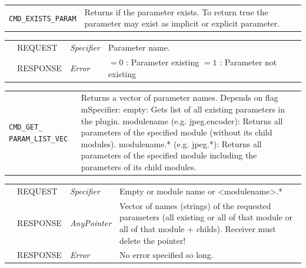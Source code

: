 \vspace{1 cm}

\noindent
\begin{tabularx}{\textwidth}{|p{3.6cm}|X|}
	\cline{1-1}\cline{2-2}
	  \lstinline|CMD_EXISTS_PARAM| & Returns if the parameter exists. To return true the parameter may exist as implicit or explicit parameter. \\
\end{tabularx}
\begin{tabularx}{\textwidth}{|p{3.6cm}|p{2.3cm}|p{2cm}|X|}
	\cline{1-1}\cline{2-2}\cline{3-3}\cline{4-4}
	   &  REQUEST     &  {\em Specifier}   &  Parameter name.   \\
	\cline{1-1}\cline{2-2}\cline{3-3}\cline{4-4}                        &  RESPONSE    &  {\em Error}  &  $=0$ : Parameter existing \newline $=1$ : Parameter not existing   \\
	\hline
\end{tabularx}

\vspace{1 cm}

\noindent
\begin{tabularx}{\textwidth}{|p{3.6cm}|X|}
	\cline{1-1}\cline{2-2}
	  \lstinline|CMD_GET_ PARAM_LIST_VEC| & Returns a vector of parameter names.  \newline Depends on flag mSpecifier:  \newline  empty: Gets list of all existing parameters in the plugin.  \newline  modulename (e.g. jpeg.encoder): Returns all parameters of the specified module (without its child modules).  \newline  modulename.* (e.g. jpeg.*): Returns all parameters of the specified module including the parameters of its child modules.\\
\end{tabularx}
\begin{tabularx}{\textwidth}{|p{3.6cm}|p{2.3cm}|p{2cm}|X|}
	\cline{1-1}\cline{2-2}\cline{3-3}\cline{4-4}
	   &  REQUEST     &  {\em Specifier}   &  Empty or module name or \newline\mbox{\textless modulename\textgreater.*}   \\
	\cline{1-1}\cline{2-2}\cline{3-3}\cline{4-4}                        &  RESPONSE    &  {\em AnyPointer}  & Vector of names (strings) of the requested parameters (all existing or all of that module or all of that module + childs). \newline Receiver must delete the pointer! \\
	\cline{1-1}\cline{2-2}\cline{3-3}\cline{4-4}                        &  RESPONSE    &  {\em Error}  &  No error specified so long. \\
	\hline
\end{tabularx}

